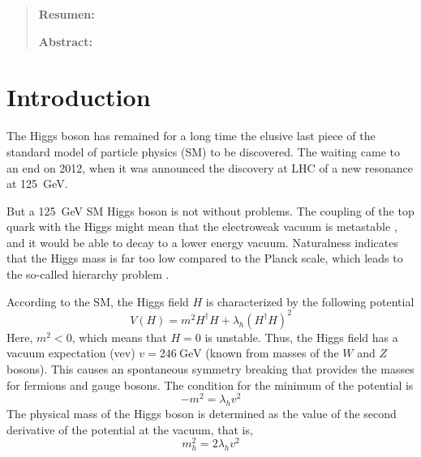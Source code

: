 \documentclass[aps,prd,preprintnumbers,nofootinbibn,twocolumn]{revtex4}
\begin{document}
\maketitle

\begin{widetext}
\begin{quotation}

{\bf Resumen:}\\



\vspace{2cm}

{\bf Abstract:}\\



\vspace{2cm}
\end{quotation}
\end{widetext}
\tableofcontents


\vspace{5cm}




\newpage
\clearpage

\section{Introduction}
The Higgs boson has remained for a long time the elusive last piece of the standard model of particle physics (SM) to be discovered. The waiting came to an end on 2012, when it was announced the discovery at LHC \cite{Aad:2012tfa,Chatrchyan:2012xdj} of a new resonance at \SI{125}{\giga\electronvolt}.

But a \SI{125}{\giga\electronvolt} SM Higgs boson is not without problems. The coupling of the top quark with the Higgs might mean that the electroweak vacuum is metastable \cite{EliasMiro:2011aa}, and it would be able to decay to a lower energy vacuum. Naturalness indicates that the Higgs mass is far too low compared to the Planck scale, which leads to the so-called hierarchy problem \cite{Iso:2013aqa}. 


According to the SM, the Higgs field $H$ is characterized by the following potential
\begin{equation}
V(H) = m^2 H^\dagger H + \lambda_h (H^\dagger H)^2
\end{equation}
Here, $m^2 < 0$, which means that $H=0$ is unstable. Thus, the Higgs field has a vacuum expectation (vev) $v=\SI{246}{\giga\electronvolt}$ (known from masses of the $W$ and $Z$ bosons). This causes an spontaneous symmetry breaking that provides the masses for fermions and gauge bosons. The condition for the minimum of the potential is 
\begin{equation}
-m^2 = \lambda_h v^2
\end{equation}
The physical mass of the Higgs boson is determined as the value of the second derivative of the potential at the vacuum, that is, 
\begin{equation}
m_h^2 = 2 \lambda_h v^2
\end{equation}
\end{document}
